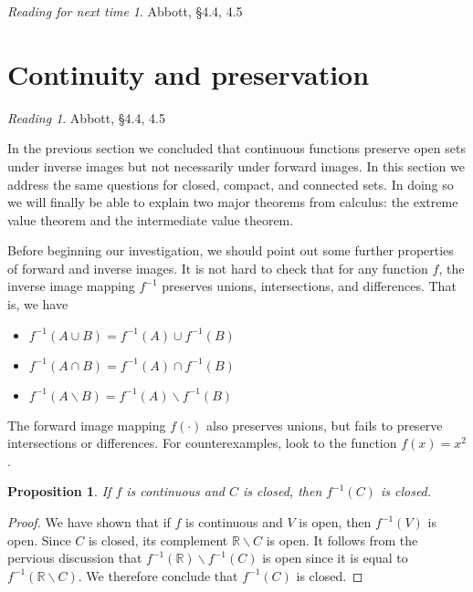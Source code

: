 \documentclass[11pt,oneside]{amsbook}
\newcommand{\R}{\mathbb R}
\renewcommand{\setminus}{\smallsetminus}
\theoremstyle{definition}
\theoremstyle{plain}
\newtheorem{proposition}[theorem]{Proposition}
\theoremstyle{definition}
\theoremstyle{remark}
\newtheorem*{reading}{Reading}
\newtheorem*{readnext}{Reading for next time}
\numberwithin{equation}{section}
\numberwithin{figure}{section}
\begin{document}
\begin{readnext}
  Abbott, \S 4.4, 4.5
\end{readnext}


\newpage
\section{Continuity and preservation}

\begin{reading}
  Abbott, \S 4.4, 4.5
\end{reading}

In the previous section we concluded that continuous functions preserve open sets under inverse images but not necessarily under forward images. In this section we address the same questions for closed, compact, and connected sets. In doing so we will finally be able to explain two major theorems from calculus: the extreme value theorem and the intermediate value theorem.

Before beginning our investigation, we should point out some further properties of forward and inverse images. It is not hard to check that for any function $f$, the inverse image mapping $f^{-1}$ preserves unions, intersections, and differences. That is, we have
\begin{itemize}
\item $f^{-1}(A\cup B)=f^{-1}(A)\cup f^{-1}(B)$
\item $f^{-1}(A\cap B)=f^{-1}(A)\cap f^{-1}(B)$
\item $f^{-1}(A\setminus B)=f^{-1}(A)\setminus f^{-1}(B)$
\end{itemize}
The forward image mapping $f(\cdot)$ also preserves unions, but fails to preserve intersections or differences. For counterexamples, look to the function $f(x)=x^2$.

\begin{proposition}
  If $f$ is continuous and $C$ is closed, then $f^{-1}(C)$ is closed.
\end{proposition}

\begin{proof}
  We have shown that if $f$ is continuous and $V$ is open, then $f^{-1}(V)$ is open. Since $C$ is closed, its complement $\R\setminus C$ is open. It follows from the pervious discussion that $f^{-1}(\R)\setminus f^{-1}(C)$ is open since it is equal to $f^{-1}(\R\setminus C)$. We therefore conclude that $f^{-1}(C)$ is closed.
\end{proof}
\end{document}
